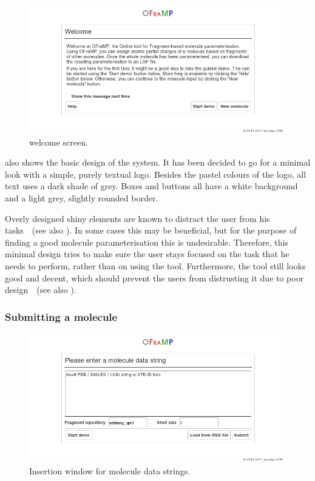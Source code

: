 \begin{figure}
\begin{center}
\includegraphics[width=.9\textwidth]{img/impl_welcome.png}
\caption{\oframp{} welcome screen.}
\end{center}
\end{figure}

 also shows the basic design of the system. It has been decided to go for a minimal look with a simple, purely textual logo. Besides the pastel colours of the logo, all text uses a dark shade of grey. Boxes and buttons all have a white background and a light grey, slightly rounded border.

Overly designed shiny elements are known to distract the user from his tasks~\cite{norman1990interfaces}~(see also ). In some cases this may be beneficial, but for the purpose of finding a good molecule parameterisation this is undesirable. Therefore, this minimal design tries to make sure the user stays focused on the task that he needs to perform, rather than on using the tool. Furthermore, the tool still looks good and decent, which should prevent the users from distrusting it due to poor design~\cite{norman2002emotion}~(see also ).

\subsubsection{Submitting a molecule}

\begin{figure}
\begin{center}
\includegraphics[width=.9\textwidth]{img/impl_inserting.png}
\caption{Insertion window for molecule data strings.}
\end{center}
\end{figure}

